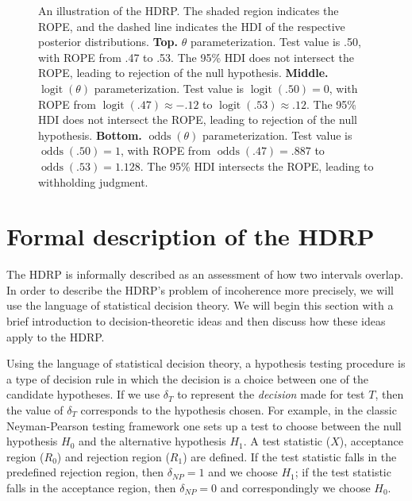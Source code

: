 \documentclass[9pt,twocolumn,twoside]{cidlab-draft}\templatetype{cidlab-invited}
\newcommand{\hdr}{HDRP}
\DeclareMathOperator*{\oddss}{odds}
\DeclareMathOperator*{\logit}{logit}
\begin{document}
\begin{figure}[!!ht]
    \caption{An illustration of the \hdr{}. The shaded region indicates the ROPE, and the dashed line indicates the HDI of the respective posterior distributions. \textbf{Top.} $\theta$ parameterization. Test value is .50, with ROPE from .47 to .53. The 95\% HDI does not intersect the ROPE, leading to rejection of the null hypothesis. \textbf{Middle.} $\logit(\theta)$ parameterization. Test value is $\logit(.50)=0$, with ROPE from $\logit(.47)\approx-.12$ to $\logit(.53)\approx.12$. The 95\% HDI does not intersect the ROPE, leading to rejection of the null hypothesis. \textbf{Bottom.} $\oddss(\theta)$ parameterization. Test value is $\oddss(.50)=1$, with ROPE from $\oddss(.47)=.887$ to $\oddss(.53)=1.128$. The 95\% HDI intersects the ROPE, leading to withholding judgment.}
    \label{fig:ropes}
\end{figure}

\section*{Formal description of the \hdr{}}

The \hdr{} is informally described as an assessment of how two intervals overlap. In order to describe the \hdr{}'s problem of incoherence more precisely, we will use the language of statistical decision theory.  We will begin this section with a brief introduction to decision-theoretic ideas and then discuss how these ideas apply to the \hdr{}.
 
Using the language of statistical decision theory, a hypothesis testing procedure is a type of decision rule in which the decision is a choice between one of the candidate hypotheses. If we use $\delta_T$ to represent the \textit{decision} made for test $T$, then the value of $\delta_T$ corresponds to the hypothesis chosen. For example, in the classic Neyman-Pearson testing framework one sets up a test to choose between the null hypothesis $H_0$ and the alternative hypothesis $H_1$. A test statistic ($X$), acceptance region ($R_0$) and rejection region ($R_1$) are defined. If the test statistic falls in the predefined rejection region, then $\delta_{NP}=1$ and we choose $H_1$; if the test statistic falls in the acceptance region, then $\delta_{NP}=0$ and correspondingly we choose $H_0$.
\end{document}

